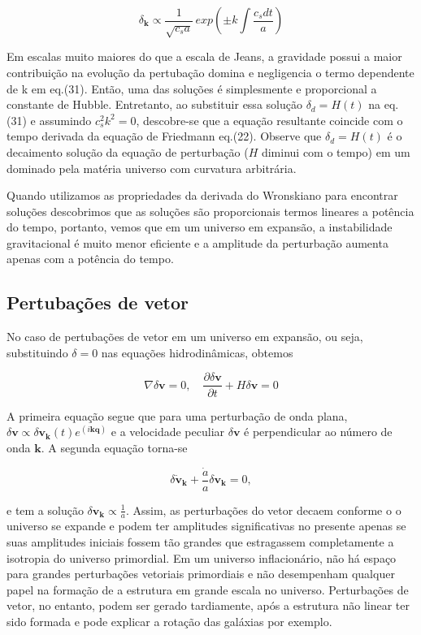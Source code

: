 \begin{equation}\label{eq34}
	\delta_\mathbf{k} \propto \dfrac{1}{\sqrt{c_s a}} \,exp\left( \pm k \int \dfrac{c_s dt}{a}\right)
\end{equation}

Em escalas muito maiores do que a escala de Jeans, a gravidade possui a maior contribuição na evolução da pertubação domina e negligencia o termo dependente de k em eq.(31). Então, uma das soluções é simplesmente e proporcional a constante de Hubble. Entretanto, ao substituir essa solução  $\delta_d = H (t)$ na eq.(31) e assumindo $c^2_s k^2 = 0$, descobre-se que a equação resultante coincide com o tempo derivada da equação de Friedmann eq.(22). Observe que $\delta_d = H (t)$ é o decaimento
solução da equação de perturbação ($ H $ diminui com o tempo) em um dominado pela matéria universo com curvatura arbitrária.

Quando utilizamos as propriedades da derivada do Wronskiano para encontrar soluções descobrimos que as soluções são proporcionais termos lineares a potência do tempo, portanto, vemos que em um universo em expansão, a instabilidade gravitacional é muito menor eficiente e a amplitude da perturbação aumenta apenas com a potência do tempo.

\subsection*{Pertubações de vetor}

No caso de pertubações de vetor em um universo em expansão, ou seja, substituindo $ \delta = 0$ nas equações hidrodinâmicas, obtemos

\begin{equation}\label{eq35}
	\nabla\delta\mathbf{v} = 0 , \quad \dfrac{\partial\delta\mathbf{v}}{\partial t } + H\delta\mathbf{v} = 0
\end{equation}

A primeira equação segue que para uma perturbação de onda plana, $\delta\mathbf{v} \propto \delta\mathbf{v}_\mathbf{k} (t)e^{(i\mathbf{kq})}$ e a velocidade peculiar $\delta\mathbf{v}$ é perpendicular ao número de onda $\mathbf{k}$. A segunda equação torna-se

\begin{equation}\label{eq36}
	\delta\dot{\mathbf{v}}_\mathbf{k}+ \dfrac{\dot{a}}{a}\delta\mathbf{v}_\mathbf{k}=0,
\end{equation}

e tem a solução $\delta\mathbf{v_k} \propto \frac{1}{a}$. Assim, as perturbações do vetor decaem conforme o
o universo se expande e podem ter amplitudes significativas no presente
apenas se suas amplitudes iniciais fossem tão grandes que estragassem completamente a isotropia do universo primordial. Em um universo inflacionário, não há espaço para grandes perturbações vetoriais primordiais e não desempenham qualquer papel na formação de
a estrutura em grande escala no universo. Perturbações de vetor, no entanto, podem ser
gerado tardiamente, após a estrutura não linear ter sido formada e pode explicar a rotação das galáxias por exemplo.

